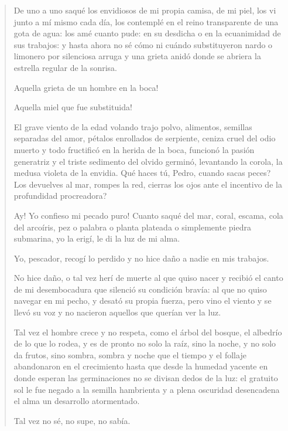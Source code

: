 \documentclass[12pt]{article}
\begin{document}
\clearpage
{}
\begin{verse}
De uno a uno saqué los envidiosos  
de mi propia camisa, de mi piel,  
los vi junto a mí mismo cada día,  
los contemplé  
en el reino transparente  
de una gota de agua:  
los amé cuanto pude: en su desdicha  
o en la ecuanimidad de sus trabajos:  
y hasta ahora no sé  
cómo ni cuándo  
substituyeron nardo o limonero  
por silenciosa arruga  
y una grieta anidó donde se abriera  
la estrella regular de la sonrisa.  

Aquella grieta de un hombre en la boca!  

Aquella miel que fue substituida!  

El grave viento de la edad  
volando  
trajo polvo, alimentos,  
semillas separadas del amor,  
pétalos enrollados de serpiente,  
ceniza cruel del odio muerto  
y todo  
fructificó en la herida de la boca,  
funcionó la pasión generatriz  
y el triste sedimento del olvido  
germinó, levantando la corola,  
la medusa violeta de la envidia.  
Qué haces tú, Pedro, cuando sacas peces?  
Los devuelves al mar, rompes la red,  
cierras los ojos ante el incentivo  
de la profundidad procreadora?  

Ay! Yo confieso mi pecado puro!  
Cuanto saqué del mar,  
coral, escama,  
cola del arcoíris,  
pez o palabra o planta plateada  
o simplemente piedra submarina,  
yo la erigí, le di la luz de mi alma.  

Yo, pescador, recogí lo perdido  
y no hice daño a nadie en mis trabajos.  

No hice daño, o tal vez herí de muerte  
al que quiso nacer y recibió  
el canto de mi desembocadura  
que silenció su condición bravía:  
al que no quiso  
navegar en mi pecho,  
y desató  
su propia fuerza,  
pero vino el viento  
y se llevó su voz y no nacieron  
aquellos que querían ver la luz.  

Tal vez el hombre crece y no respeta,  
como el árbol del bosque, el albedrío  
de lo que lo rodea,  
y es de pronto  
no solo la raíz, sino la noche,  
y no solo da frutos, sino sombra,  
sombra y noche que el tiempo y el follaje  
abandonaron en el crecimiento  
hasta que desde la humedad yacente  
en donde esperan las germinaciones  
no se divisan dedos de la luz:  
el gratuito sol le fue negado  
a la semilla hambrienta  
y a plena oscuridad desencadena  
el alma un desarrollo atormentado.  

Tal vez no sé, no supe, no sabía.  


\end{verse}
\end{document}
